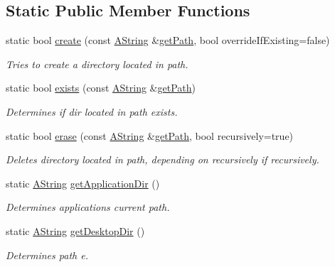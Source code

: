 \subsection*{Static Public Member Functions}
\begin{DoxyCompactItemize}
\item 
static bool \mbox{\hyperlink{class_dir_aa8e8b6434fa9900aeec3fa3bfcebef62}{create}} (const \mbox{\hyperlink{class_a_string}{A\+String}} \&\mbox{\hyperlink{class_dir_a000627e9787773619bccc3d4ef76a7ac}{get\+Path}}, bool override\+If\+Existing=false)
\begin{DoxyCompactList}\small\item\em Tries to create a directory located in path. \end{DoxyCompactList}\item 
static bool \mbox{\hyperlink{class_dir_a199893b7d2c0981704e2455d5c02cc92}{exists}} (const \mbox{\hyperlink{class_a_string}{A\+String}} \&\mbox{\hyperlink{class_dir_a000627e9787773619bccc3d4ef76a7ac}{get\+Path}})
\begin{DoxyCompactList}\small\item\em Determines if dir located in path exists. \end{DoxyCompactList}\item 
static bool \mbox{\hyperlink{class_dir_a4343d411cdea798d4744ef0d9db32b4a}{erase}} (const \mbox{\hyperlink{class_a_string}{A\+String}} \&\mbox{\hyperlink{class_dir_a000627e9787773619bccc3d4ef76a7ac}{get\+Path}}, bool recursively=true)
\begin{DoxyCompactList}\small\item\em Deletes directory located in path, depending on recursively if recursively. \end{DoxyCompactList}\item 
static \mbox{\hyperlink{class_a_string}{A\+String}} \mbox{\hyperlink{class_dir_a05e273896fb4e82bc5b45372aa4e64c1}{get\+Application\+Dir}} ()
\begin{DoxyCompactList}\small\item\em Determines application\textquotesingle{}s current path. \end{DoxyCompactList}\item 
static \mbox{\hyperlink{class_a_string}{A\+String}} \mbox{\hyperlink{class_dir_a1906abb3d8c6c8cfdec89bda40b0a616}{get\+Desktop\+Dir}} ()
\begin{DoxyCompactList}\small\item\em Determines path e. \end{DoxyCompactList}\item 

\end{DoxyCompactItemize}
